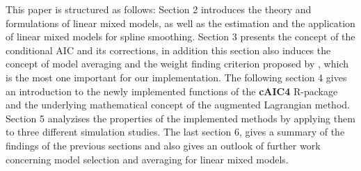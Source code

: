 This paper is structured as follows:
Section 2 introduces the theory and formulations of linear mixed models, as well as the estimation and the application of linear mixed models for spline smoothing. Section 3 presents the concept of the conditional AIC and its corrections, in addition this section also induces the concept of model averaging and the weight finding criterion proposed by \cite{Zhang.2014}, which is the most one important for our implementation. The following section 4 gives an introduction to the newly implemented functions of the \textbf{cAIC4} R-package \citep{Safken.2018} and the underlying mathematical concept of the augmented Lagrangian method. Section 5 analyzises the properties of the implemented methods by applying them to three different simulation studies. The last section 6, gives a summary of the findings of the previous sections and also gives an outlook of further work concerning model selection and averaging for linear mixed models. 